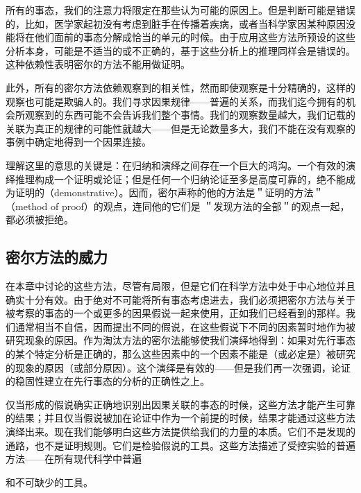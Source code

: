 所有的事态，我们的注意力将限定在那些认为可能的原因上。但是判断可能是错误的，比如，医学家起初没有考虑到脏手在传播着疾病，或者当科学家因某种原因没能将在他们面前的事态分解成恰当的单元的时候。由于应用这些方法所预设的这些分析本身，可能是不适当的或不正确的，基于这些分析上的推理同样会是错误的。这种依赖性表明密尔的方法不能用做证明。

此外，所有的密尔方法依赖观察到的相关性，然而即使观察是十分精确的，这样的观察也可能是欺骗人的。我们寻求因果规律——普遍的关系，而我们迄今拥有的机会所观察到的东西可能不会告诉我们整个事情。我们的观察数量越大，我们记载的关联为真正的规律的可能性就越大——但是无论数量多大，我们不能在没有观察的事例中确定地得到一个因果连接。

理解这里的意思的关键是：在归纳和演绎之间存在一个巨大的鸿沟。一个有效的演绎推理构成一个证明或论证；但是任何一个归纳论证至多是高度可靠的，绝不能成为证明的（demonstrative）。因而，密尔声称的他的方法是＂证明的方法＂（method of proof）的观点，连同他的它们是 ＂发现方法的全部＂的观点一起，都必须被拒绝。

\subsection{密尔方法的威力}
在本章中讨论的这些方法，尽管有局限，但是它们在科学方法中处于中心地位并且确实十分有效。由于绝对不可能将所有事态考虑进去，我们必须把密尔方法与关于被考察的事态的一个或更多的因果假说一起来使用，正如我们已经看到的那样。我们通常相当不自信，因而提出不同的假说，在这些假说下不同的因素暂时地作为被研究现象的原因。作为淘汰方法的密尔法能够使我们演绎地得到：如果对先行事态的某个特定分析是正确的，那么这些因素中的一个因素不能是（或必定是）被研究的现象的原因（或部分原因）。这个演绎是有效的——但是我们再一次强调，论证的稳固性建立在先行事态的分析的正确性之上。

仅当形成的假说确实正确地识别出因果关联的事态的时候，这些方法才能产生可靠的结果；并且仅当假说被加在论证中作为一个前提的时候，结果才能通过这些方法演绎出来。现在我们能够明白这些方法提供给我们的力量的本质。它们不是发现的通路，也不是证明规则。它们是检验假说的工具。这些方法描述了受控实验的普遍方法——在所有现代科学中普遍

和不可缺少的工具。


